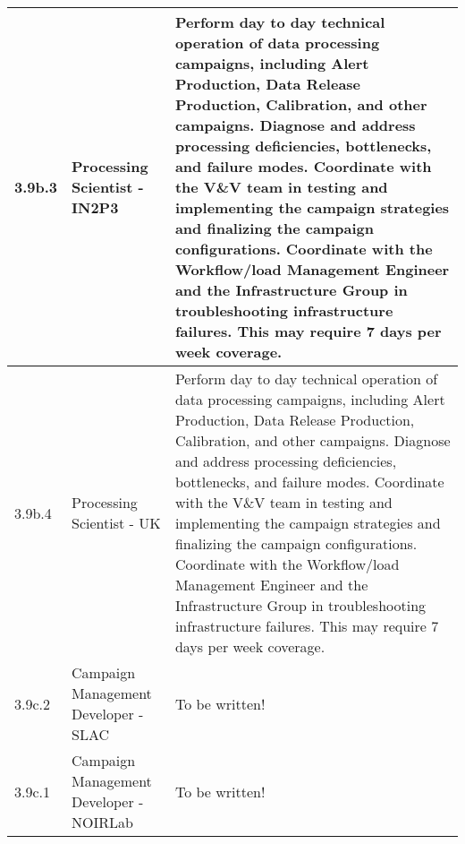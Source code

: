 \begin{longtable} {|p{}|p{}|p{}|}
{3.9b.3}&{Processing Scientist - IN2P3}&{Perform day to day technical operation of data processing campaigns, including Alert Production, Data Release Production, Calibration, and other campaigns. Diagnose and address processing deficiencies, bottlenecks, and failure modes. Coordinate with the V\&V team in testing and implementing the campaign strategies and finalizing the campaign configurations. Coordinate with the Workflow/load Management Engineer and the Infrastructure Group in troubleshooting infrastructure failures. This may require 7 days per week coverage.} \\ \hline
{3.9b.4}&{Processing Scientist - UK}&{Perform day to day technical operation of data processing campaigns, including Alert Production, Data Release Production, Calibration, and other campaigns. Diagnose and address processing deficiencies, bottlenecks, and failure modes. Coordinate with the V\&V team in testing and implementing the campaign strategies and finalizing the campaign configurations. Coordinate with the Workflow/load Management Engineer and the Infrastructure Group in troubleshooting infrastructure failures. This may require 7 days per week coverage.} \\ \hline
{3.9c.2}&{Campaign Management Developer - SLAC}&{To be written!} \\ \hline
{3.9c.1}&{Campaign Management Developer - NOIRLab}&{To be written!} \\ \hline
\end{longtable} \normalsize
